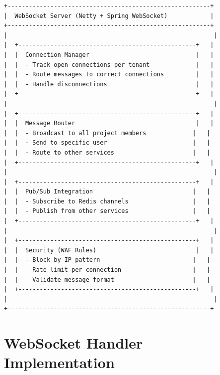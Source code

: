 \documentclass[11pt,a4paper]{report}
\begin{document}
\begin{lstlisting}[language=text]
+---------------------------------------------------------+
|  WebSocket Server (Netty + Spring WebSocket)            |
+---------------------------------------------------------+
|                                                          |
|  +--------------------------------------------------+   |
|  |  Connection Manager                              |   |
|  |  - Track open connections per tenant             |   |
|  |  - Route messages to correct connections         |   |
|  |  - Handle disconnections                         |   |
|  +--------------------------------------------------+   |
|                                                          |
|  +--------------------------------------------------+   |
|  |  Message Router                                  |   |
|  |  - Broadcast to all project members             |   |
|  |  - Send to specific user                        |   |
|  |  - Route to other services                      |   |
|  +--------------------------------------------------+   |
|                                                          |
|  +--------------------------------------------------+   |
|  |  Pub/Sub Integration                            |   |
|  |  - Subscribe to Redis channels                  |   |
|  |  - Publish from other services                  |   |
|  +--------------------------------------------------+   |
|                                                          |
|  +--------------------------------------------------+   |
|  |  Security (WAF Rules)                            |   |
|  |  - Block by IP pattern                          |   |
|  |  - Rate limit per connection                    |   |
|  |  - Validate message format                      |   |
|  +--------------------------------------------------+   |
|                                                          |
+---------------------------------------------------------+
\end{lstlisting}


\chapter{WebSocket Handler Implementation}
\end{document}
